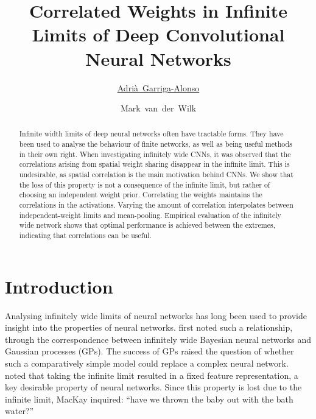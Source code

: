 \documentclass[accepted]{uai2021} %
\title{Correlated Weights in Infinite Limits of Deep Convolutional Neural Networks}
\author[1]{\href{mailto:Adrià Garriga-Alonso <ag919@cam.ac.uk>?Subject=Your UAI 2021 paper}{Adrià~Garriga-Alonso}{}}
\author[2]{Mark~van~der~Wilk}
\affil[1]{%
    Department of Engineering\\
    University of Cambridge\\
    UK
}
\affil[2]{%
    Department of Computer Science\\
    Imperial College London\\
    UK
}
\newcommand{\0}{\boldsymbol{0}}
\newcommand{\1}{\boldsymbol{1}}
\begin{document}
\maketitle

\begin{abstract}
Infinite width limits of deep neural networks often have tractable forms. They have been used to analyse the behaviour of finite networks, as well as being useful methods in their own right. When investigating infinitely wide CNNs, it was observed that the correlations arising from spatial weight sharing disappear in the infinite limit.
This is undesirable, as spatial correlation is the main motivation behind CNNs. We show that the loss of this property is not a consequence of the infinite limit, but rather of choosing an independent weight prior. Correlating the weights maintains the correlations in the activations. 
Varying the amount of correlation interpolates between independent-weight limits and mean-pooling. Empirical evaluation of the infinitely wide network shows that optimal performance is achieved between the extremes, indicating that correlations can be useful.
\end{abstract}

\section{Introduction}
Analysing infinitely wide limits of neural networks has long been used to provide insight into the properties of neural networks.
\citet{neal1996bayesian} first noted such a relationship, through the correspondence between infinitely wide Bayesian neural networks and Gaussian processes (GPs). 
The success of GPs raised the question of whether such a comparatively simple model could replace a complex neural network. \citet{mackay1998introgp} noted that taking the infinite limit resulted in a fixed feature representation, a key desirable property of neural networks. Since this property is lost due to the infinite limit, MacKay inquired: ``have we thrown the baby out with the bath water?''
\end{document}
